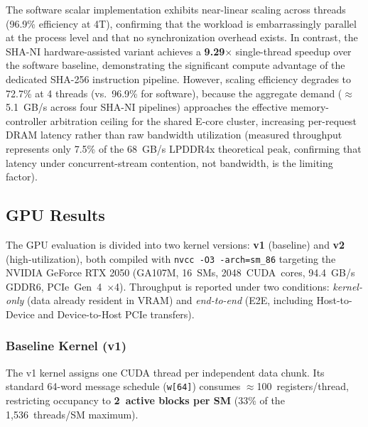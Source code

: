 \documentclass[conference]{IEEEtran}
\begin{document}
The software scalar implementation exhibits near-linear scaling across threads
(96.9\% efficiency at 4T), confirming that the workload is embarrassingly parallel
at the process level and that no synchronization overhead exists.
In contrast, the SHA-NI hardware-assisted variant achieves a \textbf{9.29$\times$}
single-thread speedup over the software baseline, demonstrating the significant
compute advantage of the dedicated SHA-256 instruction pipeline.
However, scaling efficiency degrades to 72.7\% at 4 threads (vs.\ 96.9\% for software),
because the aggregate demand ($\approx$5.1~GB/s across four SHA-NI pipelines)
approaches the effective memory-controller arbitration ceiling for the
shared E-core cluster, increasing per-request DRAM latency rather than raw
bandwidth utilization (measured throughput represents only 7.5\% of the
68~GB/s LPDDR4x theoretical peak, confirming that latency under
concurrent-stream contention, not bandwidth, is the limiting factor).

\subsection{GPU Results}

The GPU evaluation is divided into two kernel versions:
\textbf{v1} (baseline) and \textbf{v2} (high-utilization), both compiled with
\texttt{nvcc -O3 -arch=sm\_86} targeting the NVIDIA GeForce RTX 2050
(GA107M, 16~SMs, 2048~CUDA~cores, 94.4~GB/s GDDR6, PCIe~Gen~4~$\times$4).
Throughput is reported under two conditions: \emph{kernel-only} (data
already resident in VRAM) and \emph{end-to-end} (E2E, including
Host-to-Device and Device-to-Host PCIe transfers).

\subsubsection{Baseline Kernel (v1)}

The v1 kernel assigns one CUDA thread per independent data chunk.
Its standard 64-word message schedule (\texttt{w[64]}) consumes
$\approx$100~registers/thread, restricting occupancy to \textbf{2~active blocks
per SM} (33\% of the 1{,}536~threads/SM maximum).
\end{document}
